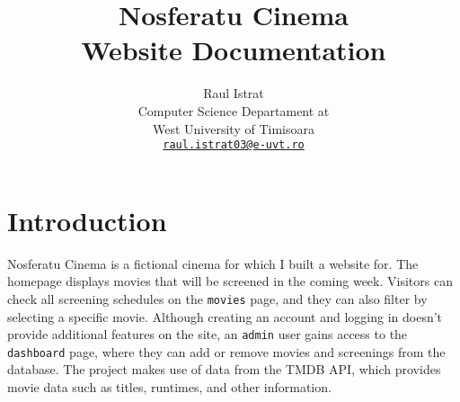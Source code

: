 \documentclass[a4paper]{article}
\title{Nosferatu Cinema\\Website Documentation}
\author{Raul Istrat\\
Computer Science Departament at\\
West University of Timisoara\\
\href{mailto:raul.istrat03@e-uvt.ro}{\texttt{raul.istrat03@e-uvt.ro}}}
\date{}
\begin{document}
\raggedright
\maketitle

\section*{Introduction}
    Nosferatu Cinema is a fictional cinema for which I built a website for. The homepage displays movies that will be screened in the coming week. Visitors can check all screening schedules on the \texttt{movies} page, and they can also filter by selecting a specific movie. Although creating an account and logging in doesn't provide additional features on the site, an \texttt{admin} user gains access to the \texttt{dashboard} page, where they can add or remove movies and screenings from the database. The project makes use of data from the TMDB API, which provides movie data such as titles, runtimes, and other information.
\end{document}
